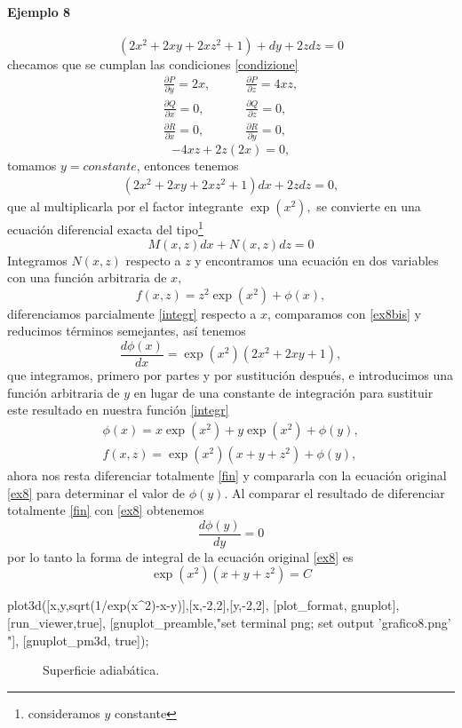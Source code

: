 \documentclass{article}
\theoremstyle{definition} \newtheorem{defi}{Definici\'on}
\theoremstyle{definition} \newtheorem{teo}{Teorema}
\theoremstyle{definition} \newtheorem{cor}{Corolario}
\begin{document}
\paragraph{Ejemplo 8}
\begin{equation}\label{ex8}
(2x^2+2xy+2xz^2+1)+dy+2zdz=0
\end{equation}
checamos que se cumplan las condiciones \eqref{condizione}
\begin{align*}
\frac{\partial P}{\partial y} = 2x, & \qquad \frac{\partial P}{\partial z} = 4xz,\\
\frac{\partial Q}{\partial x} = 0, & \qquad \frac{\partial Q}{\partial z} = 0,\\
\frac{\partial R}{\partial x} = 0, & \qquad \frac{\partial R}{\partial y} = 0,
\end{align*}
$$-4xz+2z(2x)=0,$$
tomamos $y=constante$, entonces tenemos
\begin{align}\label{ex8bis}
(2x^2+2xy+2xz^2+1)dx+2zdz=0,
\end{align}
que al multiplicarla por el factor integrante $\exp(x^2),$ se convierte en una ecuaci\'on diferencial exacta del tipo\footnote{consideramos $y$ constante}
$$M(x,z)dx+N(x,z)dz=0$$
Integramos $N(x,z)$ respecto a $z$ y encontramos una ecuaci\'on en dos variables con una funci\'on arbitraria de $x,$
\begin{equation}\label{integr}
f(x,z)=z^2\exp(x^2) + \phi(x),
\end{equation}
diferenciamos parcialmente \eqref{integr} respecto a $x$, comparamos con \eqref{ex8bis} y reducimos t\'erminos semejantes, as\'i tenemos
$$\frac{d\phi(x)}{dx}=\exp(x^2)(2x^2+2xy+1),$$
que integramos, primero por partes y por sustituci\'on despu\'es, e introducimos una funci\'on arbitraria de $y$ en lugar de una constante de integraci\'on para sustituir este resultado en nuestra funci\'on \eqref{integr}
\begin{align}\label{fin}
\phi(x)=x\exp(x^2)+y\exp(x^2)+\phi(y),\nonumber\\
f(x,z)=\exp(x^2)(x+y+z^2)+\phi(y),
\end{align}
ahora nos resta diferenciar totalmente \eqref{fin} y compararla con la ecuaci\'on original \eqref{ex8} para determinar el valor de $\phi(y)$. Al comparar el resultado de diferenciar totalmente \eqref{fin} con \eqref{ex8} obtenemos
$$\frac{d\phi(y)}{dy}=0$$
por lo tanto la forma de integral de la ecuaci\'on original \eqref{ex8} es
$$\exp(x^2)(x+y+z^2)=C$$
\begin{maximacmd}
   plot3d([x,y,sqrt(1/exp(x^2)-x-y)],[x,-2,2],[y,-2,2],
    [plot_format, gnuplot],
    [run_viewer,true],
    [gnuplot_preamble,"set terminal png; set output 'grafico8.png' "],
    [gnuplot_pm3d, true]);
\end{maximacmd}
\begin{figure}
\caption{Superficie adiab\'atica.}
\end{figure}
\end{document}
